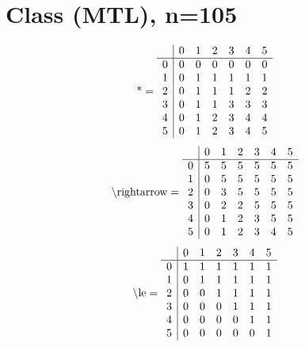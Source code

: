 \documentclass[11pt]{article}
\begin{document}
\section{Class (MTL), n=105}
\[\text{*} = 
\begin{array}{r | r r r r r r}
 & 0 & 1 & 2 & 3 & 4 & 5 \\ \hline
0 & 0 & 0 & 0 & 0 & 0 & 0 \\
1 & 0 & 1 & 1 & 1 & 1 & 1 \\
2 & 0 & 1 & 1 & 1 & 2 & 2 \\
3 & 0 & 1 & 1 & 3 & 3 & 3 \\
4 & 0 & 1 & 2 & 3 & 4 & 4 \\
5 & 0 & 1 & 2 & 3 & 4 & 5 \\
\end{array}
\]
\[\text{\textbackslash rightarrow} = 
\begin{array}{r | r r r r r r}
 & 0 & 1 & 2 & 3 & 4 & 5 \\ \hline
0 & 5 & 5 & 5 & 5 & 5 & 5 \\
1 & 0 & 5 & 5 & 5 & 5 & 5 \\
2 & 0 & 3 & 5 & 5 & 5 & 5 \\
3 & 0 & 2 & 2 & 5 & 5 & 5 \\
4 & 0 & 1 & 2 & 3 & 5 & 5 \\
5 & 0 & 1 & 2 & 3 & 4 & 5 \\
\end{array}
\]
\[\text{\textbackslash le} = 
\begin{array}{r | r r r r r r}
 & 0 & 1 & 2 & 3 & 4 & 5 \\ \hline
0 & 1 & 1 & 1 & 1 & 1 & 1 \\
1 & 0 & 1 & 1 & 1 & 1 & 1 \\
2 & 0 & 0 & 1 & 1 & 1 & 1 \\
3 & 0 & 0 & 0 & 1 & 1 & 1 \\
4 & 0 & 0 & 0 & 0 & 1 & 1 \\
5 & 0 & 0 & 0 & 0 & 0 & 1 \\
\end{array}
\]
\end{document}
